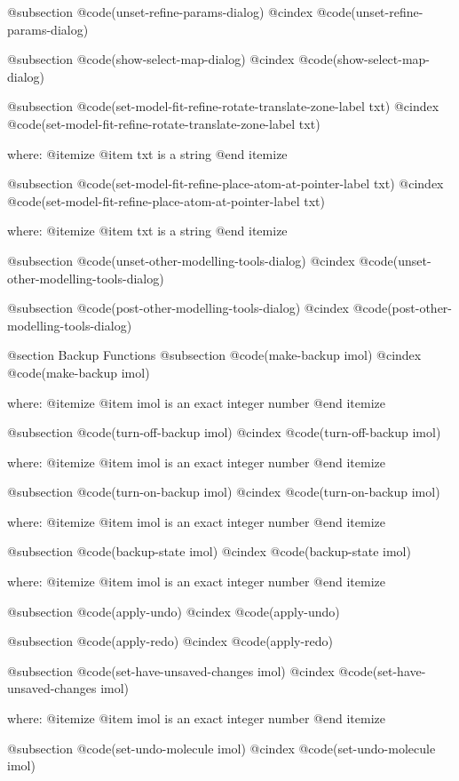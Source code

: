 @subsection @code{(unset-refine-params-dialog)}
@cindex @code{(unset-refine-params-dialog)}
 
@subsection @code{(show-select-map-dialog)}
@cindex @code{(show-select-map-dialog)}
 
@subsection @code{(set-model-fit-refine-rotate-translate-zone-label txt)}
@cindex @code{(set-model-fit-refine-rotate-translate-zone-label txt)}
 
where: 
 @itemize 
     @item txt is a string
 @end itemize


@subsection @code{(set-model-fit-refine-place-atom-at-pointer-label txt)}
@cindex @code{(set-model-fit-refine-place-atom-at-pointer-label txt)}
 
where: 
 @itemize 
     @item txt is a string
 @end itemize


@subsection @code{(unset-other-modelling-tools-dialog)}
@cindex @code{(unset-other-modelling-tools-dialog)}
 
@subsection @code{(post-other-modelling-tools-dialog)}
@cindex @code{(post-other-modelling-tools-dialog)}
 

@section Backup Functions 
@subsection @code{(make-backup imol)}
@cindex @code{(make-backup imol)}
 
where: 
 @itemize 
     @item imol is an exact integer number
 @end itemize


@subsection @code{(turn-off-backup imol)}
@cindex @code{(turn-off-backup imol)}
 
where: 
 @itemize 
     @item imol is an exact integer number
 @end itemize


@subsection @code{(turn-on-backup imol)}
@cindex @code{(turn-on-backup imol)}
 
where: 
 @itemize 
     @item imol is an exact integer number
 @end itemize


@subsection @code{(backup-state imol)}
@cindex @code{(backup-state imol)}
 
where: 
 @itemize 
     @item imol is an exact integer number
 @end itemize


@subsection @code{(apply-undo)}
@cindex @code{(apply-undo)}
 
@subsection @code{(apply-redo)}
@cindex @code{(apply-redo)}
 
@subsection @code{(set-have-unsaved-changes imol)}
@cindex @code{(set-have-unsaved-changes imol)}
 
where: 
 @itemize 
     @item imol is an exact integer number
 @end itemize


@subsection @code{(set-undo-molecule imol)}
@cindex @code{(set-undo-molecule imol)}
 
